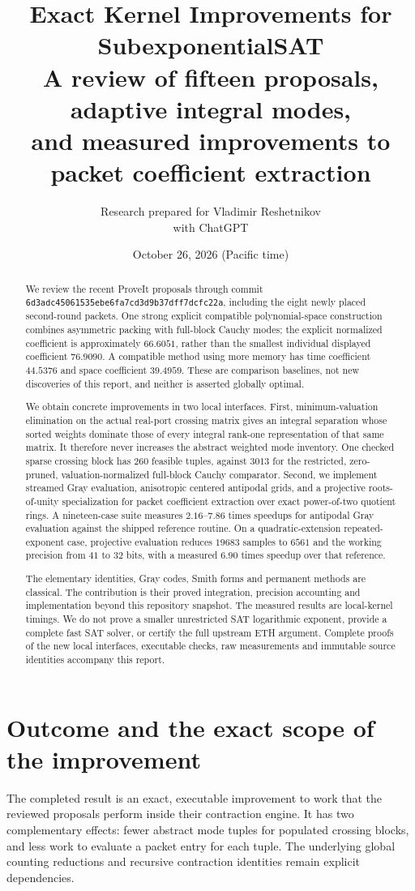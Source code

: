 \documentclass[11pt,letterpaper]{article}
\title{\textbf{Exact Kernel Improvements for SubexponentialSAT}\\[5pt]
\large A review of fifteen proposals, adaptive integral modes,\\
and measured improvements to packet coefficient extraction}
\author{Research prepared for Vladimir Reshetnikov\\with ChatGPT}
\date{October 26, 2026 (Pacific time)}
\theoremstyle{definition}\newtheorem{definition}[theorem]{Definition}
\theoremstyle{remark}\newtheorem{remark}[theorem]{Remark}
\newcommand{\pin}{\nolinkurl{6d3adc45061535ebe6fa7cd3d9b37dff7dcfc22a}}
\begin{document}
\maketitle
\begin{abstract}
We review the recent ProveIt proposals through commit \pin, including the
eight newly placed second-round packets. One strong explicit compatible
polynomial-space construction combines asymmetric packing with full-block
Cauchy modes; the explicit normalized coefficient is approximately
$66.6051$, rather than the smallest individual displayed coefficient
$76.9090$. A compatible method using more memory has time coefficient
$44.5376$ and space coefficient $39.4959$. These are comparison baselines,
not new discoveries of this report, and neither is asserted globally optimal.

We obtain concrete improvements in two local interfaces. First, minimum-valuation
elimination on the actual real-port crossing matrix gives an integral
separation whose sorted weights dominate those of every integral rank-one
representation of that same matrix. It therefore never increases the abstract
weighted mode inventory. One checked sparse crossing block has $260$ feasible
tuples, against $3013$ for the restricted, zero-pruned, valuation-normalized
full-block Cauchy comparator. Second, we implement streamed Gray evaluation,
anisotropic centered antipodal grids, and a projective roots-of-unity
specialization for packet coefficient extraction over exact power-of-two
quotient rings. A nineteen-case suite measures $2.16$--$7.86$ times speedups
for antipodal Gray evaluation against the shipped reference routine. On a
quadratic-extension repeated-exponent case, projective evaluation reduces
$19683$ samples to $6561$ and the working precision from $41$ to $32$ bits,
with a measured $6.90$ times speedup over that reference.

The elementary identities, Gray codes, Smith forms and permanent methods
are classical. The contribution is their proved integration, precision
accounting and implementation beyond this repository snapshot. The measured
results are local-kernel timings. We do not prove a smaller unrestricted SAT
logarithmic exponent, provide a complete fast SAT solver, or certify the full
upstream ETH argument. Complete proofs of the new local interfaces, executable
checks, raw measurements and immutable source identities accompany this report.
\end{abstract}
\clearpage
\tableofcontents
\clearpage

\section{Outcome and the exact scope of the improvement}
The completed result is an exact, executable improvement to work that the
reviewed proposals perform inside their contraction engine. It has two
complementary effects: fewer abstract mode tuples for populated crossing
blocks, and less work to evaluate a packet entry for each tuple. The
underlying global counting reductions and recursive contraction identities
remain explicit dependencies.
\end{document}
